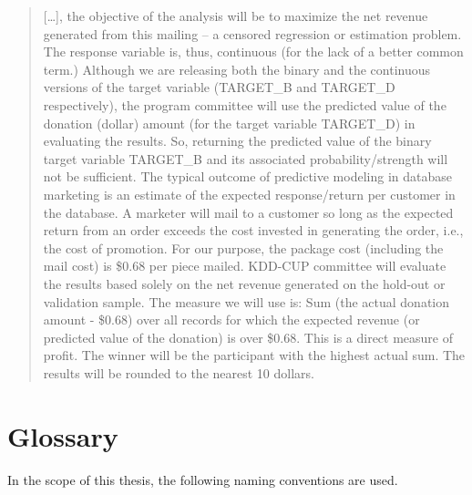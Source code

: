 \documentclass[
  11pt,
  a4paper,
  DIV=12,captions=tableheading,oneside]{scrbook}
\begin{document}
\begin{quote}
{[}\ldots{}{]}, the objective of the analysis will be to maximize the net revenue generated from this mailing -- a censored regression or estimation problem. The response variable is, thus, continuous (for the lack of a better common term.) Although we are releasing both the binary and the continuous versions of the target variable (TARGET\_B and TARGET\_D respectively), the program committee will use the predicted value of the donation (dollar) amount (for the target variable TARGET\_D) in evaluating the results. So, returning the predicted value of the binary target variable TARGET\_B and its associated probability/strength will not be sufficient.
The typical outcome of predictive modeling in database marketing is an estimate of the expected response/return per customer in the database. A marketer will mail to a customer so long as the expected return from an order exceeds the cost invested in generating the order, i.e., the cost of promotion. For our purpose, the package cost (including the mail cost) is \$0.68 per piece mailed.
KDD-CUP committee will evaluate the results based solely on the net revenue generated on the hold-out or validation sample.
The measure we will use is: Sum (the actual donation amount - \$0.68) over all records for which the expected revenue (or predicted value of the donation) is over \$0.68.
This is a direct measure of profit. The winner will be the participant with the highest actual sum. The results will be rounded to the nearest 10 dollars.
\end{quote}

\hypertarget{glossary}{%
\section{Glossary}\label{glossary}}

In the scope of this thesis, the following naming conventions are used.
\end{document}
